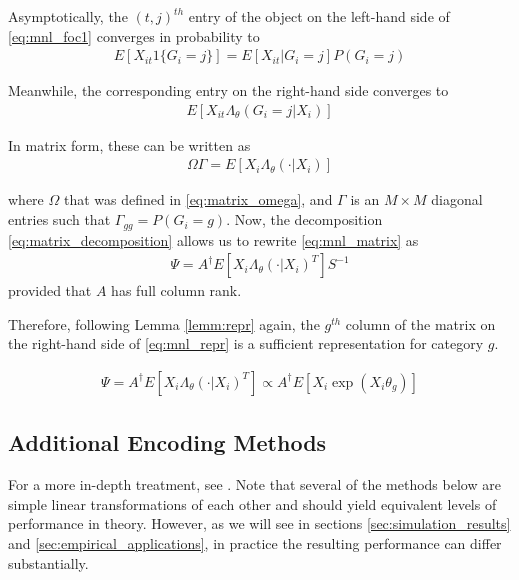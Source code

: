 \documentclass{article}
\theoremstyle{plain}
\theoremstyle{definition}
\theoremstyle{remark}
\begin{document}
Asymptotically, the $(t,j)^{th}$ entry of the object on the left-hand side of \eqref{eq:mnl_foc1} converges in probability to
\begin{align}
  E[X_{it}1\{G_{i} = j\}] = E[X_{it}|G_{i}=j]P(G_{i} = j)
  \label{eq:mnl_foc1_left}
\end{align}

\noindent Meanwhile, the corresponding entry on the right-hand side converges to
\begin{align}
  E[X_{it}\Lambda_{\theta}(G_{i} = j|X_{i})]
  \label{eq:mnl_foc1_right}
\end{align}

\noindent In matrix form, these can be written as
\begin{align}
  \Omega \Gamma = E[X_{i}\Lambda_{\theta}(\cdot |X_{i})]
  \label{eq:mnl_matrix}
\end{align}

\noindent where $\Omega$ that was defined in \eqref{eq:matrix_omega}, and $\Gamma$ is an $M \times M$ diagonal entries such that $\Gamma_{gg} = P(G_{i} = g)$. Now, the decomposition \eqref{eq:matrix_decomposition} allows us to rewrite \eqref{eq:mnl_matrix} as
\begin{align}
  \Psi = A^\dagger E[X_{i}\Lambda_{\theta}(\cdot|X_{i})^{T}] S^{-1}
  \label{eq:mnl_repr}
\end{align}
\noindent provided that $A$ has full column rank.


Therefore, following Lemma \ref{lemm:repr} again, the $g^{th}$ column of the matrix on the right-hand side of \eqref{eq:mnl_repr} is a sufficient representation for category $g$.

\begin{align}
    \Psi = A^\dagger E[X_{i}\Lambda_{\theta}(\cdot|X_{i})^{T}] \propto A^{\dagger}E[X_{i}\exp(X_{i}\theta_{g})]
    \label{eq:mnl_propto}
\end{align}






\subsection{Additional Encoding Methods}{\label{app:encodings}}

For a more in-depth treatment, see \cite{venables2016codingmatrices}. Note that several of the methods below are simple linear transformations of each other and should yield equivalent levels of performance in theory. However, as we will see in sections \ref{sec:simulation_results} and \ref{sec:empirical_applications}, in practice the resulting performance can differ substantially.
\end{document}
